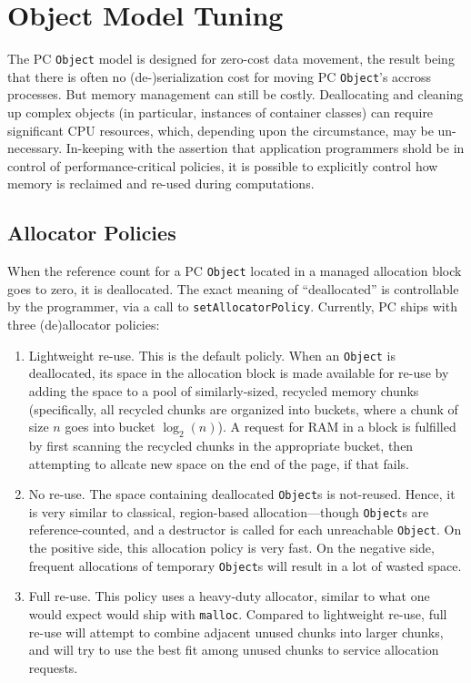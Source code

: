 \section{Object Model Tuning}

\noindent
The PC \texttt{Object} model is designed for zero-cost data movement, the result being that there is often no (de-)serialization cost
for moving PC \texttt{Object}'s accross processes.  But memory management can still be costly.  Deallocating and cleaning
up complex objects (in particular, instances of container classes) can require significant CPU resources, which, depending upon the 
circumstance, may be un-necessary.  In-keeping with the assertion that application programmers shold be in
control of performance-critical policies, it is possible to explicitly control how memory is reclaimed and re-used during computations.

\subsection{Allocator Policies}

When the reference count for a PC \texttt{Object} located in a managed allocation block goes to zero, it is deallocated.  The exact
meaning of ``deallocated'' is controllable by the programmer, via a call to \texttt{setAllocatorPolicy}.  Currently, PC ships with
three (de)allocator policies:

\begin{enumerate}

\item Lightweight re-use.  This is the default policly.  When an \texttt{Object} is deallocated, its space in the allocation block is made available for re-use by
adding the space to a pool of similarly-sized, recycled memory chunks (specifically, all recycled chunks are organized into buckets, where a chunk of size
$n$ goes into bucket $\log_2 (n)$).  A request for RAM in a block is fulfilled by first scanning the recycled chunks in the appropriate bucket, then
attempting to allcate new space on the end of the page, if that fails.
\item No re-use.  The space containing deallocated \texttt{Object}s is not-reused.  Hence, it is very similar to classical, region-based allocation---though \texttt{Object}s
are reference-counted, and a destructor is called for each unreachable \texttt{Object}.
On the positive side, this allocation policy is very fast.  On the negative side, frequent allocations of temporary \texttt{Object}s will result in a lot of wasted space.
\item Full re-use.  This policy uses a heavy-duty allocator, similar to what one would expect would ship with \texttt{malloc}.  Compared to lightweight
re-use, full re-use will attempt to combine adjacent unused chunks into larger chunks, and will try to use the best fit among unused chunks to service
allocation requests.

\end{enumerate}

